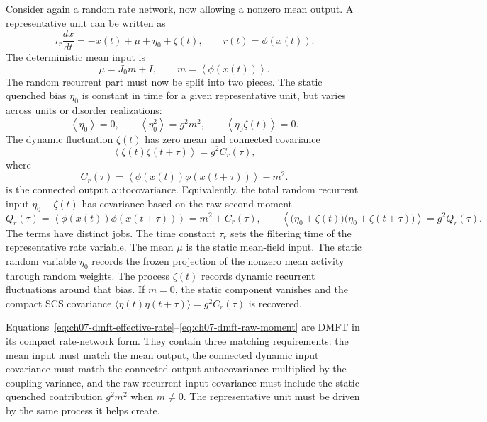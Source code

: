 Consider again a random rate network, now allowing a nonzero mean output. A
representative unit can be written as
\[
        \tau_r \frac{d x}{dt}
        =
        -x(t) + \mu + \eta_0 + \zeta(t),
        \qquad
        r(t)=\phi(x(t)).
        \label{eq:ch07-dmft-effective-rate}
\]
The deterministic mean input is
\[
        \mu = J_0 m + I,
        \qquad
        m = \left\langle \phi(x(t))\right\rangle .
        \label{eq:ch07-dmft-mean}
\]
The random recurrent part must now be split into two pieces. The static
quenched bias \(\eta_0\) is constant in time for a given representative unit,
but varies across units or disorder realizations:
\[
        \left\langle \eta_0 \right\rangle = 0,
        \qquad
        \left\langle \eta_0^2 \right\rangle = g^2m^2,
        \qquad
        \left\langle \eta_0\zeta(t) \right\rangle=0 .
        \label{eq:ch07-dmft-static-quenched-bias}
\]
The dynamic fluctuation \(\zeta(t)\) has zero mean and connected covariance
\[
        \left\langle \zeta(t)\zeta(t+\tau)\right\rangle
        =
        g^2 C_r(\tau),
        \label{eq:ch07-dmft-noise-covariance}
\]
where
\[
        C_r(\tau)
        =
        \left\langle
        \phi(x(t))\phi(x(t+\tau))
        \right\rangle
        -
        m^2 .
        \label{eq:ch07-dmft-output-covariance}
\]
is the connected output autocovariance. Equivalently, the total random recurrent
input \(\eta_0+\zeta(t)\) has covariance based on the raw second moment
\[
        Q_r(\tau)
        =
        \left\langle
        \phi(x(t))\phi(x(t+\tau))
        \right\rangle
        =
        m^2+C_r(\tau),
        \qquad
        \left\langle
        \bigl(\eta_0+\zeta(t)\bigr)
        \bigl(\eta_0+\zeta(t+\tau)\bigr)
        \right\rangle
        =
        g^2Q_r(\tau).
        \label{eq:ch07-dmft-raw-moment}
\]
The terms have distinct jobs. The time constant \(\tau_r\) sets the filtering
time of the representative rate variable. The mean \(\mu\) is the static
mean-field input. The static random variable \(\eta_0\) records the frozen
projection of the nonzero mean activity through random weights. The process
\(\zeta(t)\) records dynamic recurrent fluctuations around that bias. If
\(m=0\), the static component vanishes and the compact SCS covariance
\(\langle \eta(t)\eta(t+\tau)\rangle=g^2C_r(\tau)\) is recovered.

Equations~\eqref{eq:ch07-dmft-effective-rate}--\eqref{eq:ch07-dmft-raw-moment}
are DMFT in its compact rate-network form. They contain three matching
requirements: the mean input must match the mean output, the connected dynamic
input covariance must match the connected output autocovariance multiplied by
the coupling variance, and the raw recurrent input covariance must include the
static quenched contribution \(g^2m^2\) when \(m\ne0\). The representative unit
must be driven by the same process it helps create.


